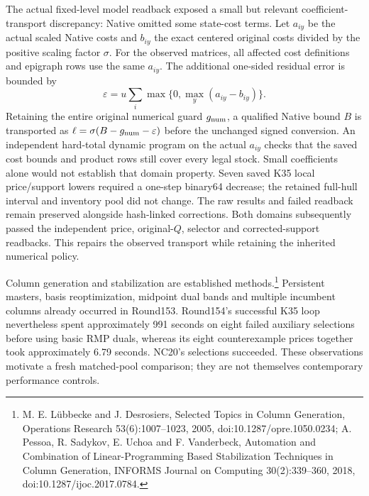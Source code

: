 The actual fixed-level model readback exposed a small but relevant
coefficient-transport discrepancy: Native omitted some state-cost terms.
Let $a_{iy}$ be the actual scaled Native costs and $b_{iy}$ the exact
centered original costs divided by the positive scaling factor $\sigma$.
For the observed matrices, all affected cost definitions and epigraph
rows use the same $a_{iy}$. The additional one-sided residual error is
bounded by
\[
 \varepsilon=u\sum_i\max\{0,\max_y(a_{iy}-b_{iy})\}.
\]
Retaining the entire original numerical guard $g_{\rm num}$, a qualified
Native bound $B$ is transported as
$\ell=\sigma(B-g_{\rm num}-\varepsilon)$ before the unchanged signed conversion.
An independent hard-total dynamic program on the actual $a_{iy}$ checks
that the saved cost bounds and product rows still cover every legal stock.
Small coefficients alone would not establish that domain property.
Seven saved K35 local price/support lowers required a one-step binary64
decrease; the retained full-hull interval and inventory pool did not change.
The raw results and failed readback remain preserved alongside hash-linked
corrections. Both domains subsequently passed the independent price,
original-$Q$, selector and corrected-support readbacks. This repairs the
observed transport while retaining the inherited numerical policy.

Column generation and stabilization are established methods.\footnote{
M. E. L\"ubbecke and J. Desrosiers, Selected Topics in Column Generation,
Operations Research 53(6):1007--1023, 2005, doi:10.1287/opre.1050.0234;
A. Pessoa, R. Sadykov, E. Uchoa and F. Vanderbeck, Automation and Combination
of Linear-Programming Based Stabilization Techniques in Column Generation,
INFORMS Journal on Computing 30(2):339--360, 2018,
doi:10.1287/ijoc.2017.0784.}
Persistent masters, basis reoptimization, midpoint dual bands and multiple
incumbent columns already occurred in Round153. Round154's successful
K35 loop nevertheless spent approximately 991 seconds on eight failed
auxiliary selections before using basic RMP duals, whereas its eight
counterexample prices together took approximately 6.79 seconds. NC20's
selections succeeded. These observations motivate a fresh matched-pool
comparison; they are not themselves contemporary performance controls.

